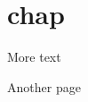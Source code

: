 \documentclass{book}
\begin{document}
\chapter{chap}

\newpage{}%
\phantom{blabla}%

More text

\newpage{}%
\phantom{blabla}%

Another page
\end{document}
